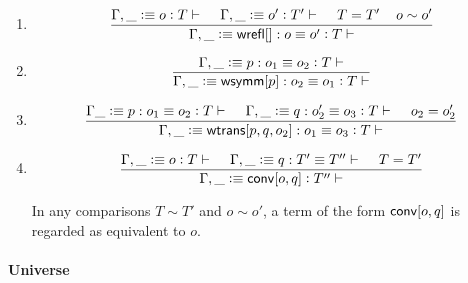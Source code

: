 \documentclass[11pt]{article}
\newcommand{\eqd}{\equiv}
\newcommand{\spc}{{\,\,\,\,\,\,\,}}
\newcommand{\ccheck}[1]{\vcentcolon#1}  %
\newcommand{\synth}[1]{\vcentcolon(\Rightarrow#1)} %
\renewcommand{\synth}[1]{\ccheck#1} %
\newcommand{\Okay}{\mathop{\text{ \sc okay}}}
\newcommand{\Context}{\vdash\Okay}
\renewcommand{\Context}{\vdash}
\newcommand{\ha}[2]{#1[#2]}
\newcommand{\annot}{{\sf annot}}
\newcommand{\conv}{{\sf conv}}
\newcommand{\wrefl}{{\sf wrefl}}
\newcommand{\wsymm}{{\sf wsymm}}
\newcommand{\wtrans}{{\sf wtrans}}
\newcommand{\var}{\char`_}
\newcommand{\defn}{\vcentcolon\equiv}
\begin{document}
\begin{enumerate}
\item 
\[\frac{
  \Gamma, \var \defn o \synth{T} \Context
  \spc
  \Gamma, \var \defn o' \synth{T'} \Context
  \spc
  T = T'
  \spc
  o \sim o'
  } {
  \Gamma, \var \defn  \ha\wrefl{}:o\eqd o' \synth{T} \Context
  } 
\]

\item 
\[\frac{\Gamma, \var \defn p:o_1\eqd o_2 \synth{T} \Context}{\Gamma, \var \defn \ha\wsymm{p}:o_2\eqd o_1 \synth{T} \Context}\]

\item 
\[\frac{\Gamma \var\defn p:o_1\eqd o_2 \synth{T} \Context 
  \spc
  \Gamma, \var\defn q:o'_2\eqd o_3 \synth{T} \Context
  \spc
  o_2 = o'_2
  } {
  \Gamma, \var \defn \ha\wtrans{p,q,o_2}:o_1\eqd o_3 \synth{T} \Context}
\]

\item 
\[\frac
    { \Gamma, \var \defn o \synth{T} \Context \spc \Gamma, \var \defn q : T' \eqd T'' \Context \spc T = T' }
    { \Gamma, \var \defn \ha\conv{o,q} \ccheck{T''} \Context}\]

In any comparisons $T\sim T'$ and $o\sim o'$, a term of the form
$\ha\conv{o,q}$ is regarded as equivalent to $o$.




\end{enumerate}

\paragraph{Universe}
\end{document}
